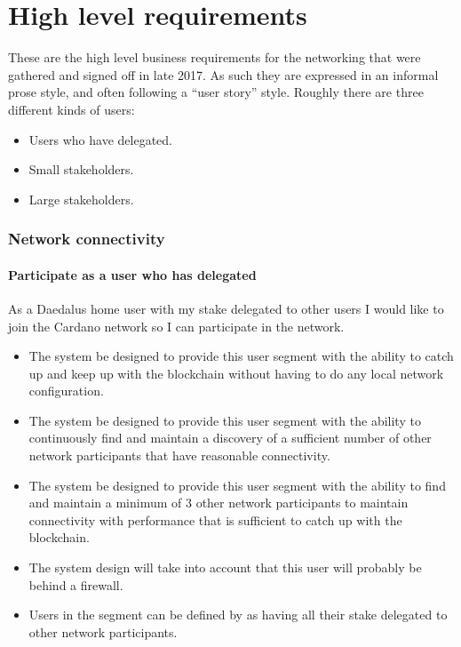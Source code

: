 \documentclass{report}
\newcommand{\wip}[1]{\color{magenta}{#1}\color{black}}
\theoremstyle{definition}{
  \newtheorem{lemma}{Lemma}[section] %
  \newtheorem{definition}[lemma]{Definition}
}
\theoremstyle{theorem}{
  \newtheorem{invariant}[lemma]{Invariant}
  \newtheorem{proofobligation}[lemma]{Proof Obligation}
}
\numberwithin{equation}{lemma}
\begin{document}
\wip{TODO:extended abstract, scope of the document}

\section{High level requirements}

These are the high level business requirements for the networking that were
gathered and signed off in late 2017. As such they are expressed in an informal
prose style, and often following a ``user story'' style.
Roughly there are three different kinds of users:
\begin{itemize}
\item Users who have delegated.
\item Small stakeholders.
\item Large stakeholders.
\end{itemize}

\subsubsection{Network connectivity}

\paragraph{Participate as a user who has delegated}

As a Daedalus home user with my stake delegated to other users I would like to
join the Cardano network so I can participate in the network.
\begin{itemize}
\item The system be designed to provide this user segment with the ability
      to catch up and keep up with the blockchain without having to do any local
      network configuration.
\item The system be designed to provide this user segment with the ability to
      continuously find and maintain a discovery of a sufficient number of
      other network participants that have reasonable connectivity.
\item The system be designed to provide this user segment with the ability to
      find and maintain a minimum of 3 other network participants to maintain
      connectivity with performance that is sufficient to catch up with the
      blockchain.
\item The system design will take into account that this user will probably be
      behind a firewall.
\item Users in the segment can be defined by as having all their stake
      delegated to other network participants.
\end{itemize}
\end{document}
